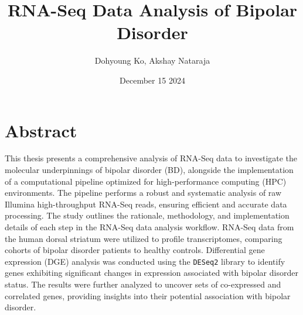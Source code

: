 \documentclass{article}
\title{RNA-Seq Data Analysis of Bipolar Disorder}
\author{Dohyoung Ko, Akshay Nataraja}
\date{December 15 2024}
\begin{document}
\renewcommand{\theFancyVerbLine}{
  \sffamily\textcolor[rgb]{0.5,0.5,0.5}{\scriptsize\arabic{FancyVerbLine}}}


\maketitle

\section*{\centering Abstract}
This thesis presents a comprehensive analysis of RNA-Seq data to investigate the molecular underpinnings of bipolar disorder (BD), alongside the implementation of a computational pipeline optimized for high-performance computing (HPC) environments. The pipeline performs a robust and systematic analysis of raw Illumina high-throughput RNA-Seq reads, ensuring efficient and accurate data processing. The study outlines the rationale, methodology, and implementation details of each step in the RNA-Seq data analysis workflow. RNA-Seq data from the human dorsal striatum were utilized to profile transcriptomes, comparing cohorts of bipolar disorder patients to healthy controls. Differential gene expression (DGE) analysis was conducted using the \texttt{DESeq2} library to identify genes exhibiting significant changes in expression associated with bipolar disorder status. The results were further analyzed to uncover sets of co-expressed and correlated genes, providing insights into their potential association with bipolar disorder.

\hfill

\tableofcontents

\pagebreak
\end{document}
